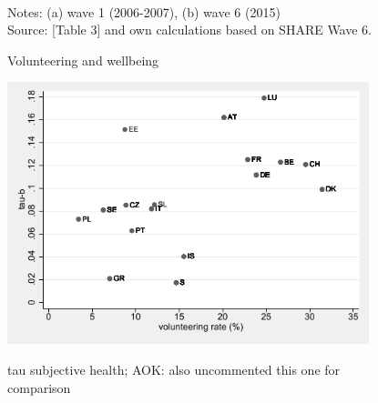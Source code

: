 \documentclass[10pt, letterpaper]{article}
\begin{document}
\begin{spacing}{1.4}
\begin{figure}[H]
\centering
\caption{Volunteering and wellbeing} 
\label{fig:taub}
\begin{minipage}{1\linewidth}
\quad
{}~\\
{\footnotesize Notes: (a) wave 1 (2006-2007), (b) wave 6 (2015) }~\\
{\footnotesize Source: \citet{haski09} [Table 3] and own calculations based on SHARE Wave 6.}
\end{minipage}
\end{figure} 



\begin{figure}[H]
 \includegraphics[height=3in]{Kendall_h.pdf}
 \centering
 \label{fig:tauH}
\caption{tau subjective health; AOK: also uncommented this one for comparison}
\end{figure}


\end{spacing}
\end{document}
